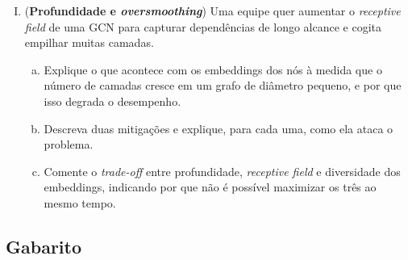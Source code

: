 \documentclass{dlproblemset}
\begin{document}
\begin{enumerate}[I)]
    \item (\textbf{Profundidade e \textit{oversmoothing}}) Uma equipe quer aumentar o \textit{receptive field} de uma GCN para capturar dependências de longo alcance e cogita empilhar muitas camadas.
    \begin{enumerate}[(a)]
        \item Explique o que acontece com os embeddings dos nós à medida que o número de camadas cresce em um grafo de diâmetro pequeno, e por que isso degrada o desempenho.
        \item Descreva duas mitigações e explique, para cada uma, como ela ataca o problema.
        \item Comente o \textit{trade-off} entre profundidade, \textit{receptive field} e diversidade dos embeddings, indicando por que não é possível maximizar os três ao mesmo tempo.
    \end{enumerate}

\end{enumerate}

\newpage
\subsection*{Gabarito}
\color{blue}
\end{document}
